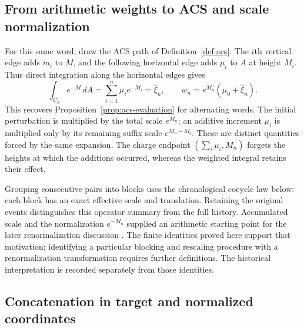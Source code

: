 \subsection{From arithmetic weights to ACS and scale normalization}
\label{subsec:appendix-alternating-acs-scale}

For this same word, draw the ACS path of Definition~\ref{def:acs}.  The $i$th
vertical edge adds $m_i$ to $M$, and the following horizontal edge adds
$\mu_i$ to $A$ at height $M_i$.  Thus direct integration along the horizontal
edges gives
\begin{equation}
  \int_{C_\alpha}e^{-M}\,dA
    =\sum_{i=1}^n\mu_i e^{-M_i}=\widehat\xi_n,
  \qquad
  w_n=e^{M_n}(\mu_0+\widehat\xi_n).
  \label{eq:appendix-alternating-acs-bridge}
\end{equation}
This recovers Proposition~\ref{prop:acs-evaluation} for alternating words.
The initial perturbation is multiplied by the total scale $e^{M_n}$; an
additive increment $\mu_i$ is multiplied only by its remaining suffix scale
$e^{M_n-M_i}$.  These are distinct quantities forced by the same expansion.
The charge endpoint $(\sum_i\mu_i,M_n)$ forgets the heights at which the
additions occurred, whereas the weighted integral retains their effect.

Grouping consecutive pairs into blocks uses the chronological cocycle law
below: each block has an exact effective scale and translation.  Retaining
the original events distinguishes this operator summary from the full
history.  Accumulated scale and the normalization $e^{-M_n}$ supplied an
arithmetic starting point for the later renormalization discussion
\cite{Yuan2025AEGScaleRenormalization}.  The finite identities proved here
support that motivation; identifying a particular blocking and rescaling
procedure with a renormalization transformation requires further definitions.
The historical interpretation is recorded separately from those identities.

\subsection{Concatenation in target and normalized coordinates}

